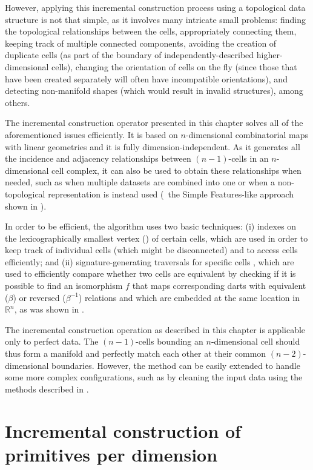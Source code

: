 However, applying this incremental construction process using a topological data structure is not that simple, as it involves many intricate small problems: finding the topological relationships between the cells, appropriately connecting them, keeping track of multiple connected components, avoiding the creation of duplicate cells (as part of the boundary of independently-described higher-dimensional cells), changing the orientation of cells on the fly (since those that have been created separately will often have incompatible orientations), and detecting non-manifold shapes (which would result in invalid structures), among others.

The incremental construction operator presented in this chapter solves all of the aforementioned issues efficiently.
It is based on $n$-dimensional combinatorial maps with linear geometries and it is fully dimension-independent.
As it generates all the incidence and adjacency relationships between $(n-1)$-cells in an $n$-dimensional cell complex, it can also be used to obtain these relationships when needed, such as when multiple datasets are combined into one or when a non-topological representation is instead used (\eg\ the Simple Features-like approach shown in ).

In order to be efficient, the algorithm uses two basic techniques:
(i) indexes on the lexicographically smallest vertex () of certain cells, which are used in order to keep track of individual cells (which might be disconnected) and to access cells efficiently; and
(ii) signature-generating traversals for specific cells \citep{Gosselin11}, which are used to efficiently compare whether two cells are equivalent by checking if it is possible to find an isomorphism $f$ that maps corresponding darts with equivalent ($\beta$) or reversed ($\beta^{-1}$) relations and which are embedded at the same location in $\mathbb{R}^n$, as was shown in .

The incremental construction operation as described in this chapter is applicable only to perfect data.
The $(n-1)$-cells bounding an $n$-dimensional cell should thus form a manifold and perfectly match each other at their common $(n-2)$-dimensional boundaries.
However, the method can be easily extended to handle some more complex configurations, such as by cleaning the input data using the methods described in .

\section{Incremental construction of primitives per dimension}
\label{se:primitives}

